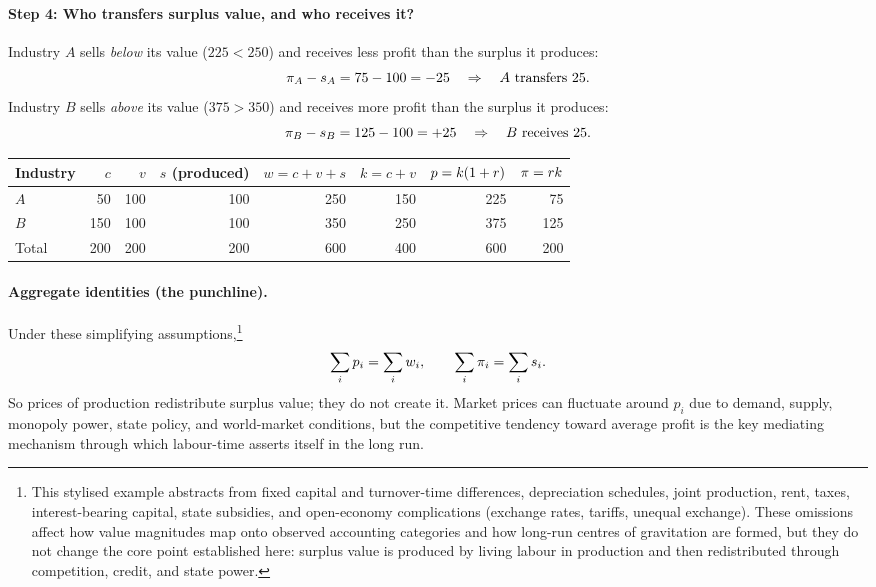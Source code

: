 \begin{example}
\paragraph{Step 4: Who transfers surplus value, and who receives it?}
Industry $A$ sells \emph{below} its value ($225<250$) and receives less profit than the surplus it produces:
\[
  \pi_A-s_A = 75-100 = -25 \quad\Rightarrow\quad \text{$A$ transfers 25.}
\]
Industry $B$ sells \emph{above} its value ($375>350$) and receives more profit than the surplus it produces:
\[
  \pi_B-s_B = 125-100 = +25 \quad\Rightarrow\quad \text{$B$ receives 25.}
\]

\medskip
\begingroup
\setlength{\tabcolsep}{6pt}
\renewcommand{\arraystretch}{1.15}
\begin{center}
\begin{tabular}{@{}lrrrrrrr@{}}
\toprule
Industry & $c$ & $v$ & $s$ (produced) & $w=c+v+s$ & $k=c+v$ & $p=k(1+r)$ & $\pi=r k$ \\
\midrule
$A$ & 50  & 100 & 100 & 250 & 150 & 225 & 75  \\
$B$ & 150 & 100 & 100 & 350 & 250 & 375 & 125 \\
\midrule
Total & 200 & 200 & 200 & 600 & 400 & 600 & 200 \\
\bottomrule
\end{tabular}
\end{center}
\endgroup

\paragraph{Aggregate identities (the punchline).}
Under these simplifying assumptions,\footnote{This stylised example abstracts from fixed capital and turnover-time differences, depreciation schedules, joint production, rent, taxes, interest-bearing capital, state subsidies, and open-economy complications (exchange rates, tariffs, unequal exchange). These omissions affect how value magnitudes map onto observed accounting categories and how long-run centres of gravitation are formed, but they do not change the core point established here: surplus value is produced by living labour in production and then redistributed through competition, credit, and state power.}
\[
  \sum_i p_i = \sum_i w_i,
  \qquad
  \sum_i \pi_i = \sum_i s_i.
\]
So prices of production redistribute surplus value; they do not create it. Market prices can
fluctuate around $p_i$ due to demand, supply, monopoly power, state policy, and world-market
conditions, but the competitive tendency toward average profit is the key mediating mechanism
through which labour-time asserts itself in the long run.\cite{Marx1894,Shaikh2016}


\end{example}
